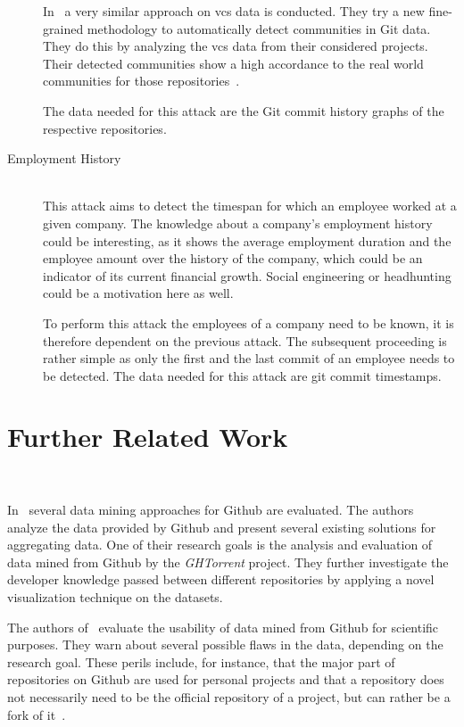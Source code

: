 \begin{description}
        In~\cite{inproceedings:developer-networks} a very similar approach on \ac{vcs} data is conducted.
        They try a new fine-grained methodology to automatically detect communities in Git data.
        They do this by analyzing the \ac{vcs} data from their considered projects.
        Their detected communities show a high accordance to the real world communities for those repositories~\cite[p.~10]{inproceedings:developer-networks}.

        The data needed for this attack are the Git commit history graphs of the respective repositories.

    \item[Employment History] \hfill \\
        This attack aims to detect the timespan for which an employee worked at a given company.
        The knowledge about a company's employment history could be interesting, as it shows the average employment duration and the employee amount over the history of the company, which could be an indicator of its current financial growth.
        Social engineering or headhunting could be a motivation here as well.

        To perform this attack the employees of a company need to be known, it is therefore dependent on the previous attack.
        The subsequent proceeding is rather simple as only the first and the last commit of an employee needs to be detected.
        The data needed for this attack are git commit timestamps.

\end{description}


\section{Further Related Work}~\label{further-related-work}

In~\cite{git-mining} several data mining approaches for Github are evaluated.
The authors analyze the data provided by Github and present several existing solutions for aggregating data.
One of their research goals is the analysis and evaluation of data mined from Github by the \emph{GHTorrent} project.
They further investigate the developer knowledge passed between different repositories by applying a novel visualization technique on the datasets.

The authors of~\cite{inproceedings:promises-and-perils} evaluate the usability of data mined from Github for scientific purposes.
They warn about several possible flaws in the data, depending on the research goal.
These perils include, for instance, that the major part of repositories on Github are used for personal projects and that a repository does not necessarily need to be the official repository of a project, but can rather be a fork of it~\cite[p.~4]{inproceedings:promises-and-perils}.
